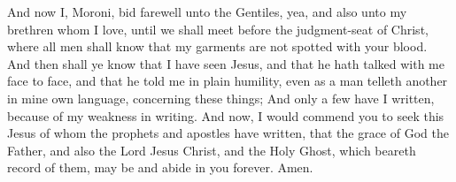 \bverse \iffalse And now I, Moroni, bid farewell unto the Gentiles, yea, and also unto my brethren whom I love, until we shall meet before the judgment-seat of Christ, where all men shall know that my garments are not spotted with your blood. \fi
And now I, Moroni, bid farewell unto the Gentiles, yea, and also unto my brethren whom I love, until we shall meet before the judgment-seat of Christ, where all men shall know that my garments are not spotted with your blood.
\bverse \iffalse And then shall ye know that I have seen Jesus, and that he hath talked with me face to face, and that he told me in plain humility, even as a man telleth another in mine own language, concerning these things; \fi
And then shall ye know that I have seen Jesus, and that he hath talked with me face to face, and that he told me in plain humility, even as a man telleth another in mine own language, concerning these things;
\bverse \iffalse And only a few have I written, because of my weakness in writing. \fi
And only a few have I written, because of my weakness in writing.
\bverse \iffalse And now, I would commend you to seek this Jesus of whom the prophets and apostles have written, that the grace of God the Father, and also the Lord Jesus Christ, and the Holy Ghost, which beareth record of them, may be and abide in you forever. Amen. \fi
And now, I would commend you to seek this Jesus of whom the prophets and apostles have written, that the grace of God the Father, and also the Lord Jesus Christ, and the Holy Ghost, which beareth record of them, may be and abide in you forever. Amen.

